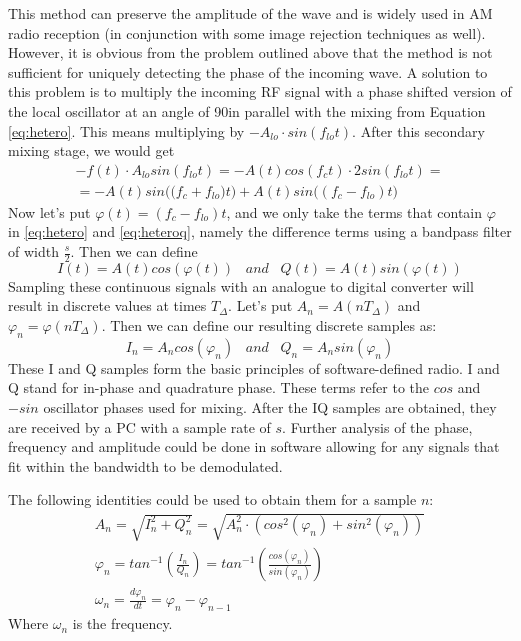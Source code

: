 \documentclass[a4paper,12pt,twoside,openright]{report}
\begin{document}
This method can preserve the amplitude of the wave and is widely used in AM radio reception (in conjunction with some image rejection techniques as well). However, it is obvious from the problem outlined above that the method is not sufficient for uniquely detecting the phase of the incoming wave. A solution to this problem is to multiply the incoming RF signal with a phase shifted version of the local oscillator at an angle of 90\degree in parallel with the mixing from Equation \ref{eq:hetero}. This means multiplying by $-A_{lo} \cdot sin(f_{lo} t)$. After this secondary mixing stage, we would get
\begin{multline}
\label{eq:heteroq}
- f(t) \cdot A_{lo} sin(f_{lo} t) =  -A(t) cos(f_{c} t) \cdot 2 sin(f_{lo} t) = \\
=  - A(t) sin\big( (f_{c} + f_{lo} \big) t\big) + A(t) sin\big( (f_{c} - f_{lo}) t \big)
\end{multline}
Now let's put $\varphi(t) = (f_{c}-f_{lo}) t$, and we only take the terms that contain $\varphi$ in \ref{eq:hetero} and \ref{eq:heteroq}, namely the difference terms using a bandpass filter of width $\frac{s}{2}$. Then we can define
\begin{equation}
I(t) = A(t) cos( \varphi (t)) \,\,\,\,\, and \,\,\,\,\, Q(t) = A(t) sin( \varphi (t))
\end{equation}
Sampling these continuous signals with an analogue to digital converter will result in discrete values at times $T_{\Delta}$. Let's put $A_{n} = A(n T_{\Delta})$ and $\varphi_{n} = \varphi(n T_{\Delta})$. Then we can define our resulting discrete samples as:
\begin{equation}
I_{n} = A_{n} cos( \varphi_{n} ) \,\,\,\,\, and \,\,\,\,\, Q_{n} = A_{n} sin( \varphi _{n})
\end{equation}
These I and Q samples form the basic principles of software-defined radio. I and Q stand for in-phase and quadrature phase\cite{kirkhorn1999introduction}. These terms refer to the $cos$ and $-sin$ oscillator phases used for mixing. After the IQ samples are obtained, they are received by a PC with a sample rate of $s$. Further analysis of the phase, frequency and amplitude could be done in software allowing for any signals that fit within the bandwidth to be demodulated.

The following identities could be used to obtain them for a sample $n$:
\begin{subequations}
\begin{align}
A_{n} = \sqrt{I_n^2+Q_n^2} = \sqrt{A_{n}^2 \cdot (cos^2(\varphi_n) + sin^2(\varphi_n))} \\
\varphi_{n} = tan^{-1}\left(\frac{I_{n}}{Q_{n}}\right) = tan^{-1}\left(\frac{cos(\varphi_{n})}{sin(\varphi_{n})}\right) \\
\omega_{n} = \frac{d \varphi_{n}}{dt} = \varphi_{n} - \varphi_{n-1}
\end{align}
\end{subequations}
Where $\omega_{n}$ is the frequency.
\end{document}
